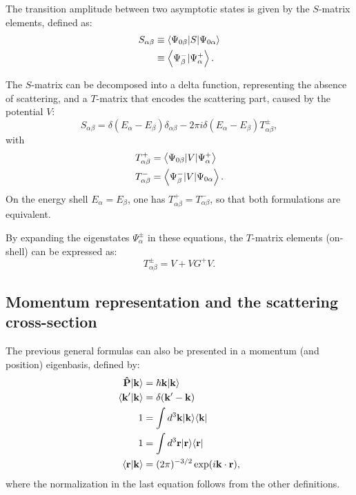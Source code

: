 The transition amplitude between two asymptotic states is given by the $S$-matrix elements, defined as:
\begin{align}
  S_{\alpha\beta} &\equiv \left\langle \Psi_{0\beta} \vert S \vert \Psi_{0\alpha} \right\rangle \nonumber\\
  & \equiv \left\langle \Psi_\beta^- \vert \Psi_\alpha^+ \right\rangle.
  \label{<++>}
\end{align}

The $S$-matrix can be decomposed into a delta function, representing the absence of scattering, and a $T$-matrix that encodes the scattering part, caused by the potential $V$:
\begin{equation*}
  S_{\alpha\beta} = \delta (E_\alpha - E_\beta)\delta_{\alpha\beta} - 2\pi i \delta (E_\alpha - E_\beta) T^\pm_{\alpha\beta},
\end{equation*}
with
\begin{align*}
  T^+_{\alpha\beta} & = \left\langle \Psi_{0\beta} \vert V \vert \Psi^+_\alpha \right\rangle \\
  T^-_{\alpha\beta} & = \left\langle \Psi^-_\beta \vert V \vert \Psi_{0\alpha} \right\rangle.
\end{align*}
On the energy shell $E_\alpha = E_\beta$, one has $T^+_{\alpha\beta}= T^-_{\alpha\beta}$, so that both formulations are equivalent.

By expanding the eigenstates $\Psi^\pm_\alpha$ in these equations, the $T$-matrix elements (on-shell) can be expressed as:
\begin{equation*}
  T^\pm_{\alpha\beta} = V + VG^+ V.
\end{equation*}


\subsection{Momentum representation and the scattering cross-section}

The previous general formulas can also be presented in a momentum (and position) eigenbasis, defined by:
\begin{align*}
  \mathbf{\hat{P}}\vert \mathbf{k} \rangle & = \hbar \mathbf{k} \vert \mathbf{k} \rangle \\
  \left\langle \mathbf{k'} \vert \mathbf{k} \right\rangle & = \delta(\mathbf{k'}-\mathbf{k}) \\
  1 &= \int d^3\mathbf{k} \vert \mathbf{k} \rangle \langle \mathbf{k} \vert \\
  1 &= \int d^3\mathbf{r} \vert \mathbf{r} \rangle \langle \mathbf{r} \vert \\
  \left\langle \mathbf{r} \vert \mathbf{k} \right\rangle
  &= (2\pi)^{-3/2} \exp (i\mathbf{k}\cdot\mathbf{r}),
\end{align*}
where the normalization in the last equation follows from the other definitions.

